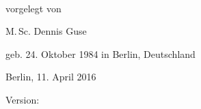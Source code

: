 \begin{titlepage}
    \begin{addmargin}[-1cm]{-3cm}
    \begin{center}
        \large  

        \hfill

        \vfill

        \begingroup
            \color{Maroon}\spacedallcaps{\myTitle} \\ \bigskip
        \endgroup

				\vspace{0.7cm}	
				vorgelegt von
				
				\vspace{0.7cm}	
				M.\,Sc. Dennis Guse
				
				geb. 24. Oktober 1984 in Berlin, Deutschland



%				
%				
%
%				
%
%				
%			



				\vspace{1cm}
				Berlin, 11. April 2016

				\vspace{0.7cm}	
				Version: \myVersion				
%
%
%


\end{center}
\end{addmargin}
\end{titlepage}
